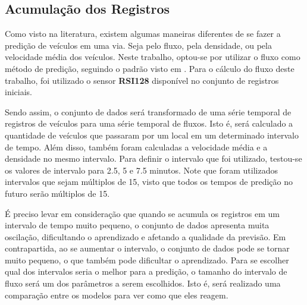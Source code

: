 \subsection{Acumulação dos Registros}

Como visto na literatura, existem algumas maneiras diferentes de se fazer a predição de veículos em uma via. Seja pelo fluxo, pela densidade, ou pela velocidade média dos veículos. Neste trabalho, optou-se por utilizar o fluxo como método de predição, seguindo o padrão visto em \cite{lana_2018}. Para o cálculo do fluxo deste trabalho, foi utilizado o sensor \textbf{RSI128} disponível no conjunto de registros iniciais.

Sendo assim, o conjunto de dados será transformado de uma série temporal de registros de veículos para uma série temporal de fluxos. Isto é, será calculado a quantidade de veículos que passaram por um local em um determinado intervalo de tempo. Além disso, também foram calculadas a velocidade média e a densidade no mesmo intervalo. Para definir o intervalo que foi utilizado, testou-se os valores de intervalo para 2.5, 5 e 7.5 minutos. Note que foram utilizados intervalos que sejam múltiplos de 15, visto que todos os tempos de predição no futuro serão múltiplos de 15.

É preciso levar em consideração que quando se acumula os registros em um intervalo de tempo muito pequeno, o conjunto de dados apresenta muita oscilação, dificultando o aprendizado e afetando a qualidade da previsão. Em contrapartida, ao se aumentar o intervalo, o conjunto de dados pode se tornar muito pequeno, o que também pode dificultar o aprendizado. Para se escolher qual dos intervalos seria o melhor para a predição, o tamanho do intervalo de fluxo será um dos parâmetros a serem escolhidos. Isto é, será realizado uma comparação entre os modelos para ver como que eles reagem. 

